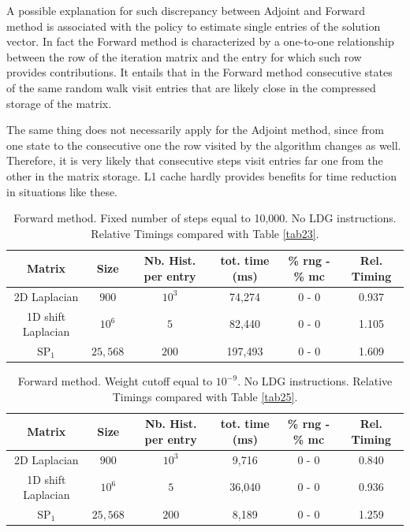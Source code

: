 \documentclass[a4paper,10pt]{article}
\begin{document}
A possible explanation for such discrepancy between 
Adjoint and Forward method is associated with the policy to estimate single 
entries of the solution vector. In fact the Forward method is characterized by 
a one-to-one relationship between the row of the iteration matrix and 
the entry for which such row provides contributions. It entails that in the 
Forward method consecutive states of the same random walk visit entries that 
are likely close in the compressed storage of the matrix. 

The same thing does not necessarily apply for the Adjoint method, since from 
one state to the consecutive one the row visited by the algorithm changes as 
well. Therefore, it is very likely that consecutive steps visit entries far one 
from the other in the matrix storage. L1 cache hardly provides benefits for 
time reduction in situations like these.

\begin{table}[!h]
\hspace*{-1cm}
\begin{tabular}{|c|c|c|c|c|c|}
\hline
\textbf{Matrix} & \textbf{Size} &\textbf{Nb. Hist. per entry} & tot. time 
(ms) & \% rng - 
\% mc  & Rel. Timing\\
\hline
2D Laplacian& $900$ & $10^3$ & 74,274 & 0 - 0 & 0.937\\
\hline 
1D shift Laplacian& $10^6$ & $5$ & 82,440 & 0 - 0 & 1.105\\
\hline
$\text{SP}_1$ & $25,568$ & $200$ & 197,493 & 0 - 0 & 1.609\\
\hline
\end{tabular}
\caption{Forward method. Fixed number of steps equal to 10,000. No LDG 
instructions. Relative Timings compared with Table 
\ref{tab23}.}
\label{tab38}
\end{table}



\begin{table}[!h]
\hspace*{-1cm}
\begin{tabular}{|c|c|c|c|c|c|}
\hline
\textbf{Matrix} & \textbf{Size} &\textbf{Nb. Hist. per entry} & tot. time 
(ms) & \% rng - 
\% mc  & Rel. Timing\\
\hline
2D Laplacian& $900$ & $10^3$ & 9,716 & 0 - 0 & 0.840\\
\hline 
1D shift Laplacian& $10^6$ & $5$ & 36,040 & 0 - 0 & 0.936\\
\hline
$\text{SP}_1$ & $25,568$ & $200$ & 8,189 & 0 - 0 & 1.259\\
\hline
\end{tabular}
\caption{Forward method. Weight cutoff equal to $10^{-9}$. No LDG 
instructions. Relative Timings compared with Table 
\ref{tab25}.}
\label{tab39}
\end{table}
\end{document}
